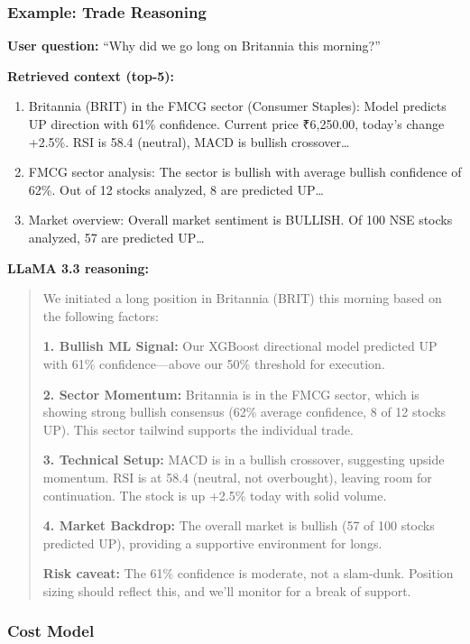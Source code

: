\documentclass[11pt,a4paper]{article}
\begin{document}
\subsubsection{Example: Trade Reasoning}

\textbf{User question:} ``Why did we go long on Britannia this morning?''

\textbf{Retrieved context (top-5):}
\begin{enumerate}
    \item Britannia (BRIT) in the FMCG sector (Consumer Staples): Model predicts UP direction with 61\% confidence. Current price ₹6,250.00, today's change +2.5\%. RSI is 58.4 (neutral), MACD is bullish crossover…
    \item FMCG sector analysis: The sector is bullish with average bullish confidence of 62\%. Out of 12 stocks analyzed, 8 are predicted UP…
    \item Market overview: Overall market sentiment is BULLISH. Of 100 NSE stocks analyzed, 57 are predicted UP…
\end{enumerate}

\textbf{LLaMA 3.3 reasoning:}

\begin{quote}
We initiated a long position in Britannia (BRIT) this morning based on the following factors:

\textbf{1. Bullish ML Signal:} Our XGBoost directional model predicted UP with 61\% confidence—above our 50\% threshold for execution.

\textbf{2. Sector Momentum:} Britannia is in the FMCG sector, which is showing strong bullish consensus (62\% average confidence, 8 of 12 stocks UP). This sector tailwind supports the individual trade.

\textbf{3. Technical Setup:} MACD is in a bullish crossover, suggesting upside momentum. RSI is at 58.4 (neutral, not overbought), leaving room for continuation. The stock is up +2.5\% today with solid volume.

\textbf{4. Market Backdrop:} The overall market is bullish (57 of 100 stocks predicted UP), providing a supportive environment for longs.

\textbf{Risk caveat:} The 61\% confidence is moderate, not a slam-dunk. Position sizing should reflect this, and we'll monitor for a break of support.
\end{quote}

\subsubsection{Cost Model}
\end{document}
